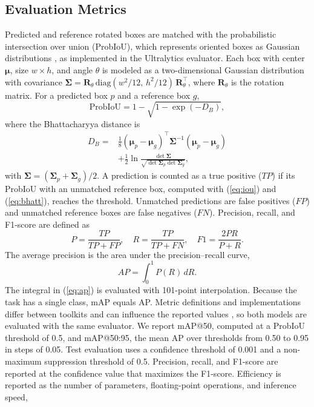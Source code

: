 \documentclass[conference]{IEEEtran}
\begin{document}
\subsection{Evaluation Metrics}
Predicted and reference rotated boxes are matched with the probabilistic intersection over union (ProbIoU), which represents oriented boxes as Gaussian distributions \cite{murrugarra2024probiou}, as implemented in the Ultralytics evaluator. Each box with center $\boldsymbol{\mu}$, size $w \times h$, and angle $\theta$ is modeled as a two-dimensional Gaussian distribution with covariance $\boldsymbol{\Sigma} = \mathbf{R}_\theta\, \mathrm{diag}(w^2/12,\, h^2/12)\, \mathbf{R}_\theta^{\top}$, where $\mathbf{R}_\theta$ is the rotation matrix. For a predicted box $p$ and a reference box $g$,
\begin{equation}
	\mathrm{ProbIoU} = 1 - \sqrt{1 - \exp(-D_B)},
	\label{eq:iou}
\end{equation}
where the Bhattacharyya distance is
\begin{equation}
	\begin{split}
		D_B = {} & \frac{1}{8} (\boldsymbol{\mu}_p - \boldsymbol{\mu}_g)^{\top} \boldsymbol{\Sigma}^{-1} (\boldsymbol{\mu}_p - \boldsymbol{\mu}_g) \\
		& + \frac{1}{2} \ln \frac{\det \boldsymbol{\Sigma}}{\sqrt{\det \boldsymbol{\Sigma}_p \det \boldsymbol{\Sigma}_g}},
	\end{split}
	\label{eq:bhatt}
\end{equation}
with $\boldsymbol{\Sigma} = (\boldsymbol{\Sigma}_p + \boldsymbol{\Sigma}_g)/2$. A prediction is counted as a true positive ($TP$) if its ProbIoU with an unmatched reference box, computed with (\ref{eq:iou}) and (\ref{eq:bhatt}), reaches the threshold. Unmatched predictions are false positives ($FP$) and unmatched reference boxes are false negatives ($FN$). Precision, recall, and F1-score are defined as
\begin{equation}
	P = \frac{TP}{TP + FP}, \quad R = \frac{TP}{TP + FN}, \quad F1 = \frac{2PR}{P + R}.
	\label{eq:prf}
\end{equation}
The average precision is the area under the precision--recall curve,
\begin{equation}
	AP = \int_{0}^{1} P(R)\, dR.
	\label{eq:ap}
\end{equation}
The integral in (\ref{eq:ap}) is evaluated with 101-point interpolation. Because the task has a single class, mAP equals AP. Metric definitions and implementations differ between toolkits and can influence the reported values \cite{padilla2021}, so both models are evaluated with the same evaluator. We report mAP@50, computed at a ProbIoU threshold of 0.5, and mAP@50:95, the mean AP over thresholds from 0.50 to 0.95 in steps of 0.05. Test evaluation uses a confidence threshold of 0.001 and a non-maximum suppression threshold of 0.5. Precision, recall, and F1-score are reported at the confidence value that maximizes the F1-score. Efficiency is reported as the number of parameters, floating-point operations, and inference speed,
\end{document}
